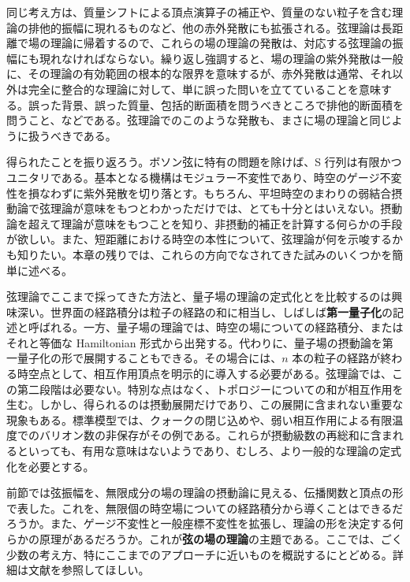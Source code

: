 同じ考え方は、質量シフトによる頂点演算子の補正や、質量のない粒子を含む理論の排他的振幅に現れるものなど、他の赤外発散にも拡張される。弦理論は長距離で場の理論に帰着するので、これらの場の理論の発散は、対応する弦理論の振幅にも現れなければならない。繰り返し強調すると、場の理論の紫外発散は一般に、その理論の有効範囲の根本的な限界を意味するが、赤外発散は通常、それ以外は完全に整合的な理論に対して、単に誤った問いを立てていることを意味する。誤った背景、誤った質量、包括的断面積を問うべきところで排他的断面積を問うこと、などである。弦理論でのこのような発散も、まさに場の理論と同じように扱うべきである。

得られたことを振り返ろう。ボソン弦に特有の問題を除けば、S 行列は有限かつユニタリである。基本となる機構はモジュラー不変性であり、時空のゲージ不変性を損なわずに紫外発散を切り落とす。もちろん、平坦時空のまわりの弱結合摂動論で弦理論が意味をもつとわかっただけでは、とても十分とはいえない。摂動論を超えて理論が意味をもつことを知り、非摂動的補正を計算する何らかの手段が欲しい。また、短距離における時空の本性について、弦理論が何を示唆するかも知りたい。本章の残りでは、これらの方向でなされてきた試みのいくつかを簡単に述べる。

\label{sec:9.6}

弦理論でここまで採ってきた方法と、量子場の理論の定式化とを比較するのは興味深い。世界面の経路積分は粒子の経路の和に相当し、しばしば\textbf{第一量子化}の記述と呼ばれる。一方、量子場の理論では、時空の場についての経路積分、またはそれと等価な Hamiltonian 形式から出発する。代わりに、量子場の摂動論を第一量子化の形で展開することもできる。その場合には、$n$ 本の粒子の経路が終わる時空点として、相互作用頂点を明示的に導入する必要がある。弦理論では、この第二段階は必要ない。特別な点はなく、トポロジーについての和が相互作用を生む。しかし、得られるのは摂動展開だけであり、この展開に含まれない重要な現象もある。標準模型では、クォークの閉じ込めや、弱い相互作用による有限温度でのバリオン数の非保存がその例である。これらが摂動級数の再総和に含まれるといっても、有用な意味はないようであり、むしろ、より一般的な理論の定式化を必要とする。

前節では弦振幅を、無限成分の場の理論の摂動論に見える、伝播関数と頂点の形で表した。これを、無限個の時空場についての経路積分から導くことはできるだろうか。また、ゲージ不変性と一般座標不変性を拡張し、理論の形を決定する何らかの原理があるだろうか。これが\textbf{弦の場の理論}の主題である。ここでは、ごく少数の考え方、特にここまでのアプローチに近いものを概説するにとどめる。詳細は文献を参照してほしい。

